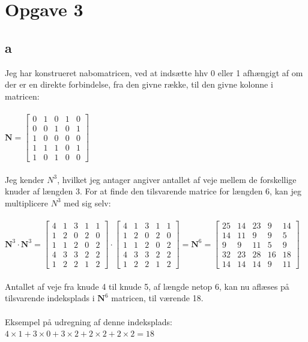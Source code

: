 \documentclass{article}
\begin{document}
\section*{Opgave 3}
\subsection*{a}
Jeg har konstrueret nabomatricen, ved at indsætte hhv 0 eller 1 afhængigt af om der er en direkte forbindelse, fra den givne række, til den givne kolonne i matricen:
\\
\\
$\mathbf{N}=\left[\begin{array}{lllll}0 & 1 & 0 & 1 & 0 \\ 0 & 0 & 1 & 0 & 1 \\ 1 & 0 & 0 & 0 & 0 \\ 1 & 1 & 1 & 0 & 1 \\ 1 & 0 & 1 & 0 & 0\end{array}\right]$
\\
\\
Jeg kender $N^{3}$, hvilket jeg antager angiver antallet af veje mellem de forskellige knuder af længden 3. For at finde den tilsvarende matrice for længden 6, kan jeg multiplicere $N^{3}$ med sig selv:
\\
\\
$\mathbf{N}^3 \cdot \mathbf{N}^3=\left[\begin{array}{lllll}4 & 1 & 3 & 1 & 1 \\ 1 & 2 & 0 & 2 & 0 \\ 1 & 1 & 2 & 0 & 2 \\ 4 & 3 & 3 & 2 & 2 \\ 1 & 2 & 2 & 1 & 2\end{array}\right] \cdot\left[\begin{array}{lllll}4 & 1 & 3 & 1 & 1 \\ 1 & 2 & 0 & 2 & 0 \\ 1 & 1 & 2 & 0 & 2 \\ 4 & 3 & 3 & 2 & 2 \\ 1 & 2 & 2 & 1 & 2\end{array}\right]=\mathbf{N}^6=\left[\begin{array}{lllll}25 & 14 & 23 & 9 & 14 \\ 14 & 11 & 9 & 9 & 5 \\ 9 & 9 & 11 & 5 & 9 \\ 32 & 23 & 28 & 16 & 18 \\ 14 & 14 & 14 & 9 & 11\end{array}\right]$
\\
\\
Antallet af veje fra knude 4 til knude 5, af længde netop 6, kan nu aflæses på tilsvarende indeksplads i $\mathbf{N}^6$ matricen, til værende 18. 
\\
\\
Eksempel på udregning af denne indeksplads:
$4 \times 1+3 \times 0+3 \times 2+2 \times 2+2 \times 2=18$
\end{document}
